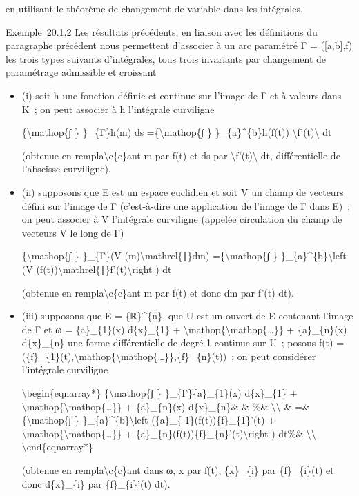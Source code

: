 \documentclass[]{article}
\begin{document}
en utilisant le théorème de changement de variable dans les intégrales.

Exemple~20.1.2 Les résultats précédents, en liaison avec les définitions
du paragraphe précédent nous permettent d'associer à un arc paramétré Γ
= ({[}a,b{]},f) les trois types suivants d'intégrales, tous trois
invariants par changement de paramétrage admissible et croissant

\begin{itemize}
\item
  (i) soit h une fonction définie et continue sur l'image de Γ et à
  valeurs dans K~; on peut associer à h l'intégrale curviligne

  \{\textbackslash{}mathop\{∫ \} \}\_\{Γ\}h(m) ds
  =\{\textbackslash{}mathop\{∫ \} \}\_\{a\}\^{}\{b\}h(f(t))
  \textbackslash{}\textbar{}f'(t)\textbackslash{}\textbar{} dt

  (obtenue en rempla\textbackslash{}c\{c\}ant m par f(t) et ds par
  \textbackslash{}\textbar{}f'(t)\textbackslash{}\textbar{} dt,
  différentielle de l'abscisse curviligne).
\item
  (ii) supposons que E est un espace euclidien et soit V un champ de
  vecteurs défini sur l'image de Γ (c'est-à-dire une application de
  l'image de Γ dans E)~; on peut associer à V l'intégrale curviligne
  (appelée circulation du champ de vecteurs V le long de Γ)

  \{\textbackslash{}mathop\{∫ \} \}\_\{Γ\}(V
  (m)\textbackslash{}mathrel\{∣\}dm) =\{\textbackslash{}mathop\{∫ \}
  \}\_\{a\}\^{}\{b\}\textbackslash{}left (V
  (f(t))\textbackslash{}mathrel\{∣\}f'(t)\textbackslash{}right ) dt

  (obtenue en rempla\textbackslash{}c\{c\}ant m par f(t) et donc dm par
  f'(t) dt).
\item
  (iii) supposons que E = \{ℝ\}\^{}\{n\}, que U est un ouvert de E
  contenant l'image de Γ et ω = \{a\}\_\{1\}(x) d\{x\}\_\{1\} +
  \textbackslash{}mathop\{\textbackslash{}mathop\{\ldots{}\}\} +
  \{a\}\_\{n\}(x) d\{x\}\_\{n\} une forme différentielle de degré 1
  continue sur U~; posons f(t) =
  (\{f\}\_\{1\}(t),\textbackslash{}mathop\{\textbackslash{}mathop\{\ldots{}\}\},\{f\}\_\{n\}(t))~;
  on peut considérer l'intégrale curviligne

  \textbackslash{}begin\{eqnarray*\} \{\textbackslash{}mathop\{∫ \}
  \}\_\{Γ\}\{a\}\_\{1\}(x) d\{x\}\_\{1\} +
  \textbackslash{}mathop\{\textbackslash{}mathop\{\ldots{}\}\} +
  \{a\}\_\{n\}(x) d\{x\}\_\{n\}\& \& \%\&
  \textbackslash{}\textbackslash{} \& =\& \{\textbackslash{}mathop\{∫ \}
  \}\_\{a\}\^{}\{b\}\textbackslash{}left (\{a\}\_\{
  1\}(f(t))\{f\}\_\{1\}'(t) +
  \textbackslash{}mathop\{\textbackslash{}mathop\{\ldots{}\}\} +
  \{a\}\_\{n\}(f(t))\{f\}\_\{n\}'(t)\textbackslash{}right ) dt\%\&
  \textbackslash{}\textbackslash{} \textbackslash{}end\{eqnarray*\}

  (obtenue en rempla\textbackslash{}c\{c\}ant dans ω, x par f(t),
  \{x\}\_\{i\} par \{f\}\_\{i\}(t) et donc d\{x\}\_\{i\} par
  \{f\}\_\{i\}'(t) dt).
\end{itemize}
\end{document}

